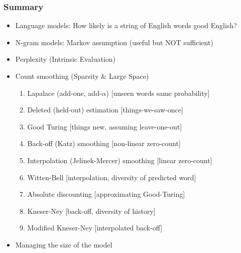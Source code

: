 \documentclass{beamer}
\begin{document}
\begin{frame}\frametitle{Summary}

\begin{itemize}
\item  Language models: How \alert{likely} is a string of English words
  good English? 
\item  N-gram models: Markov assumption (useful but \alert{NOT} sufficient) 
\item  Perplexity (Intrinsic Evaluation)
\item  Count smoothing (Sparsity \& Large Space)
\begin{enumerate}
\item  Lapalace (add-one, add-$\alpha$) [\alert{unseen words same
  probability}] 
\item  Deleted (held-out) estimation [\alert{things-we-saw-once}]
\item  Good Turing [\alert{things new}, assuming leave-one-out]
\item  Back-off (Katz) smoothing [\alert{non-linear} zero-count]
\item  Interpolation (Jelinek-Mercer) smoothing [\alert{linear} zero-count]
\item  Witten-Bell [interpolation, \alert{diversity} of predicted word]
\item  Absolute discounting [\alert{approximating} Good-Turing]
\item  Kneser-Ney [back-off, \alert{diversity} of history]
\item  Modified Kneser-Ney [\alert{interpolated back-off}]
\end{enumerate}
\item  Managing the size of the model
\end{itemize}

\end{frame}

\end{document}

